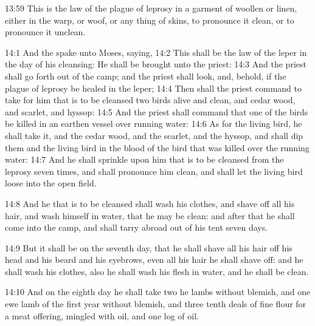 13:59 This is the law of the plague of leprosy in a garment of woollen or linen, either in the warp, or woof, or any thing of skins, to pronounce it clean, or to pronounce it unclean.

14:1 And the \LORD spake unto Moses, saying, 14:2 This shall be the law of the leper in the day of his cleansing: He shall be brought unto the priest: 14:3 And the priest shall go forth out of the camp; and the priest shall look, and, behold, if the plague of leprosy be healed in the leper; 14:4 Then shall the priest command to take for him that is to be cleansed two birds alive and clean, and cedar wood, and scarlet, and hyssop: 14:5 And the priest shall command that one of the birds be killed in an earthen vessel over running water: 14:6 As for the living bird, he shall take it, and the cedar wood, and the scarlet, and the hyssop, and shall dip them and the living bird in the blood of the bird that was killed over the running water: 14:7 And he shall sprinkle upon him that is to be cleansed from the leprosy seven times, and shall pronounce him clean, and shall let the living bird loose into the open field.

14:8 And he that is to be cleansed shall wash his clothes, and shave off all his hair, and wash himself in water, that he may be clean: and after that he shall come into the camp, and shall tarry abroad out of his tent seven days.

14:9 But it shall be on the seventh day, that he shall shave all his hair off his head and his beard and his eyebrows, even all his hair he shall shave off: and he shall wash his clothes, also he shall wash his flesh in water, and he shall be clean.

14:10 And on the eighth day he shall take two he lambs without blemish, and one ewe lamb of the first year without blemish, and three tenth deals of fine flour for a meat offering, mingled with oil, and one log of oil.

